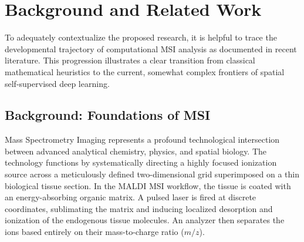 \documentclass[
12pt, %
oneside, %
english, %
onehalfspacing, %
nolistspacing, %
headsepline, %
]{MastersDoctoralThesis} %
\begin{document}

\chapter{Background and Related Work}

To adequately contextualize the proposed research, it is helpful to trace the developmental trajectory of computational MSI analysis as documented in recent literature. This progression illustrates a clear transition from classical mathematical heuristics to the current, somewhat complex frontiers of spatial self-supervised deep learning.

\section{Background: Foundations of MSI}

Mass Spectrometry Imaging represents a profound technological intersection between advanced analytical chemistry, physics, and spatial biology. The technology functions by systematically directing a highly focused ionization source across a meticulously defined two-dimensional grid superimposed on a thin biological tissue section. In the MALDI MSI workflow, the tissue is coated with an energy-absorbing organic matrix. A pulsed laser is fired at discrete coordinates, sublimating the matrix and inducing localized desorption and ionization of the endogenous tissue molecules. An analyzer then separates the ions based entirely on their mass-to-charge ratio ($m/z$).\citep{caprioli1997maldi, korber2025mass}
\end{document}

